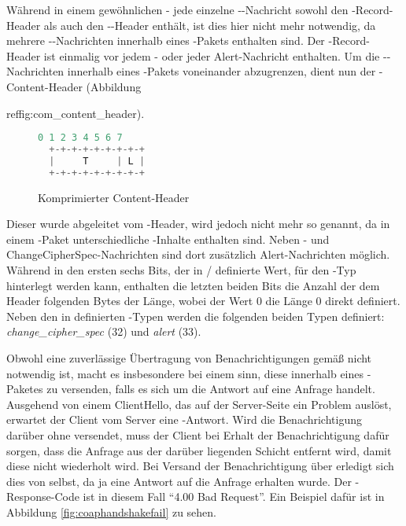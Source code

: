Während in einem gewöhnlichen - jede einzelne --Nachricht sowohl den -Record-Header als auch den
--Header enthält, ist dies hier nicht mehr notwendig, da mehrere --Nachrichten innerhalb eines -Pakets
enthalten sind. Der -Record-Header ist einmalig vor jedem - oder jeder Alert-Nachricht enthalten. Um die --Nachrichten
innerhalb eines -Pakets voneinander abzugrenzen, dient nun der -Content-Header (Abbildung {ref{fig:com\_content\_header}).

\begin{figure}[ht]
  \centering
  \begin{lstlisting}[language=c]
   0 1 2 3 4 5 6 7
  +-+-+-+-+-+-+-+-+
  |     T     | L |
  +-+-+-+-+-+-+-+-+
  \end{lstlisting}
  \caption{Komprimierter Content-Header}
  \label{fig:com_content_header}
\end{figure}

Dieser wurde abgeleitet vom -Header, wird jedoch nicht mehr so genannt, da in einem -Paket unterschiedliche -Inhalte
enthalten sind. Neben - und ChangeCipherSpec-Nachrichten sind dort zusätzlich Alert-Nachrichten möglich. Während in den ersten sechs Bits, der in
/ definierte Wert, für den -Typ hinterlegt werden kann, enthalten die letzten beiden Bits die Anzahl der dem Header folgenden
Bytes der Länge, wobei der Wert 0 die Länge 0 direkt definiert. Neben den in  definierten -Typen werden die folgenden
beiden Typen definiert: \textit{change\_cipher\_spec} (32) und \textit{alert} (33).

Obwohl eine zuverlässige Übertragung von Benachrichtigungen gemäß  nicht notwendig ist, macht es insbesondere bei einem  sinn, diese
innerhalb eines -Paketes zu versenden, falls es sich um die Antwort auf eine Anfrage handelt. Ausgehend von einem ClientHello, das
auf der Server-Seite ein Problem auslöst, erwartet der Client vom Server eine -Antwort. Wird die Benachrichtigung darüber ohne  versendet,
muss der Client bei Erhalt der Benachrichtigung dafür sorgen, dass die Anfrage aus der darüber liegenden  Schicht entfernt wird, damit diese
nicht wiederholt wird. Bei Versand der Benachrichtigung über  erledigt sich dies von selbst, da ja eine Antwort auf die Anfrage erhalten wurde.
Der -Response-Code ist in diesem Fall "`4.00 Bad Request"'. Ein Beispiel dafür ist in Abbildung \ref{fig:coaphandshakefail} zu sehen.

}
